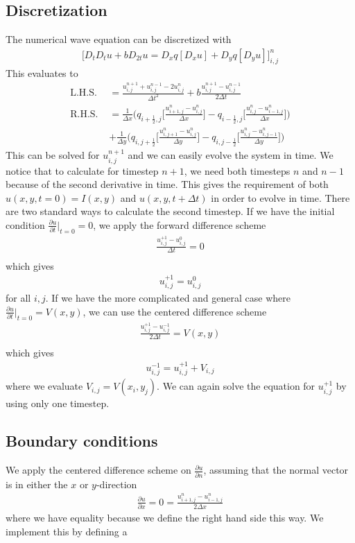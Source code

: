 \documentclass[a4paper,10pt]{article}
\renewcommand{\(}{\left(}
\renewcommand{\)}{\right)}
\newcommand{\dpart}[2]{\frac{\partial#1}{\partial#2}}
\newcommand{\f}[2]{\frac{#1}{#2}}
\begin{document}
\subsection*{Discretization}
The numerical wave equation can be discretized with
\begin{align*}
\Big[D_tD_t u + bD_{2t}u = D_x  q[D_x u] + D_y q [D_y u]\Big]^n_{i,j}
\end{align*}
This evaluates to
\begin{align*}
\text{L.H.S. } & = \f{u^{n+1}_{i,j} + u^{n-1}_{i,j} - 2u^{n}_{i,j}}{\Delta t^2} + b\f{u^{n+1}_{i,j}-u^{n-1}_{i,j}}{2\Delta t}\\
\text{R.H.S. } & = \f{1}{\Delta x}\Bigg(q_{i+\f{1}{2},j}\Bigg[\f{u^n_{i+1,j} - u^n_{i,j}}{\Delta x}\Bigg]
- q_{i-\f{1}{2},j}\Bigg[\f{u^n_{i,j} - u^n_{i-1,j}}{\Delta x}\Bigg]\Bigg)\\
&+\f{1}{\Delta y}\Bigg(q_{i,j+\f{1}{2}}\Bigg[\f{u^n_{i,j+1} - u^n_{i,j}}{\Delta y}\Bigg]
- q_{i,j-\f{1}{2}}\Bigg[\f{u^n_{i,j} - u^n_{i,j-1}}{\Delta y}\Bigg]\Bigg)
\end{align*}
This can be solved for $u_{i,j}^{n+1}$ and we can easily evolve the system in time. We notice that to calculate for timestep $n+1$, we need both timesteps $n$ and $n-1$ because of the second derivative in time. This gives the requirement of both $u(x,y,t=0) = I(x,y)$ and $u(x,y,t+\Delta t)$ in order to evolve in time. There are two standard ways to calculate the second timestep. If we have the initial condition $\dpart{u}{t}|_{t=0}=0$, we apply the forward difference scheme
\begin{align*}
\f{u^{+1}_{i,j} - u^{0}_{i,j}}{\Delta t} = 0\\
\end{align*}
which gives
\begin{align*}
u^{+1}_{i,j} = u^{0}_{i,j}
\end{align*}
for all $i,j$. If we have the more complicated and general case where $\dpart{u}{t}|_{t=0} = V(x,y)$, we can use the centered difference scheme 
\begin{align*}
\f{u^{+1}_{i,j} - u^{-1}_{i,j}}{2\Delta t} = V(x,y)\\
\end{align*}
which gives
\begin{align*}
u^{-1}_{i,j} = u^{+1}_{i,j} + V_{i,j}
\end{align*}
where we evaluate $V_{i,j} = V(x_i,y_j)$. We can again solve the equation for $u_{i,j}^{+1}$ by using only one timestep.
\subsection*{Boundary conditions}
We apply the centered difference scheme on $\dpart{u}{n}$, assuming that the normal vector is in either the $x$ or $y$-direction
\begin{align*}
\dpart{u}{x} = 0 = \f{u^n_{i+1,j} - u^n_{i-1,j} }{ 2\Delta x}
\end{align*}
where we have equality because we define the right hand side this way. We implement this by defining a 
\end{document}
